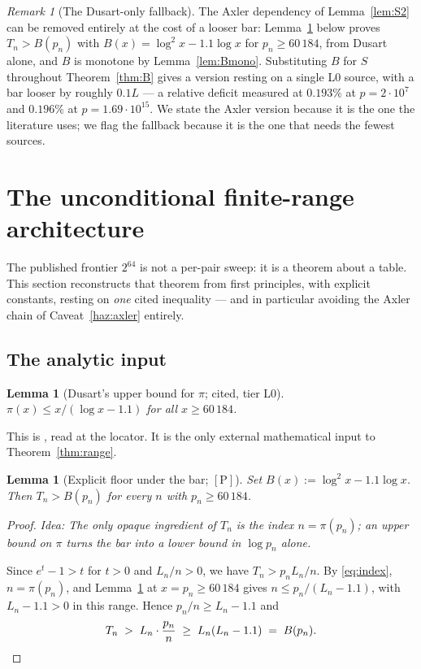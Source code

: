 \documentclass[11pt,a4paper]{article}
\theoremstyle{plain}
\newtheorem{lemma}[theorem]{Lemma}
\theoremstyle{definition}
\theoremstyle{remark}
\newtheorem{remark}[theorem]{Remark}
\newcommand{\idea}[1]{\emph{Idea: #1}\par\smallskip}
\newcommand{\cP}{{[\mathrm{P}]}}
\begin{document}
\begin{remark}[The Dusart-only fallback]
\label{rem:dusartonly}
The Axler dependency of Lemma~\ref{lem:S2} can be removed entirely at the cost of a looser
bar: Lemma~\ref{lem:floor} below proves $T_n > B(p_n)$ with $B(x) = \log^2 x - 1.1\log x$
for $p_n \ge 60\,184$, from Dusart alone, and $B$ is monotone by Lemma~\ref{lem:Bmono}.
Substituting $B$ for $S$ throughout Theorem~\ref{thm:B} gives a version resting on a single
L0 source, with a bar looser by roughly $0.1 L$ --- a relative deficit measured at $0.193\%$ at
$p = 2\cdot10^7$ and $0.196\%$ at $p = 1.69\cdot10^{15}$. We state the Axler version because
it is the one the literature uses; we flag the fallback because it is the one that needs the
fewest sources.
\end{remark}

\section{The unconditional finite-range architecture}
\label{sec:range}

The published frontier $2^{64}$ is not a per-pair sweep: it is a theorem about a table. This
section reconstructs that theorem from first principles, with explicit constants, resting on
\emph{one} cited inequality --- and in particular avoiding the Axler chain of
Caveat~\ref{haz:axler} entirely.

\subsection{The analytic input}

\begin{lemma}[Dusart's upper bound for $\pi$; cited, tier L0]
\label{lem:dusart}
$\pi(x) \le x/(\log x - 1.1)$ for all $x \ge 60\,184$.
\end{lemma}

This is \cite[Thm.~6.9, eq.~(6.6)]{dusart2010estimates}, read at the locator. It is the only
external mathematical input to Theorem~\ref{thm:range}.

\begin{lemma}[Explicit floor under the bar; $\cP$]
\label{lem:floor}
Set $B(x) := \log^2 x - 1.1\log x$. Then $T_n > B(p_n)$ for every $n$ with
$p_n \ge 60\,184$.
\end{lemma}

\begin{proof}
\idea{The only opaque ingredient of $T_n$ is the index $n = \pi(p_n)$; an \emph{upper} bound
on $\pi$ turns the bar into a lower bound in $\log p_n$ alone.}
Since $e^t - 1 > t$ for $t > 0$ and $L_n/n > 0$, we have $T_n > p_n L_n/n$. By
\eqref{eq:index}, $n = \pi(p_n)$, and Lemma~\ref{lem:dusart} at $x = p_n \ge 60\,184$ gives
$n \le p_n/(L_n - 1.1)$, with $L_n - 1.1 > 0$ in this range. Hence $p_n/n \ge L_n - 1.1$ and
\[
T_n \;>\; L_n \cdot \frac{p_n}{n} \;\ge\; L_n(L_n - 1.1) \;=\; B(p_n) . \qedhere
\]
\end{proof}
\end{document}
